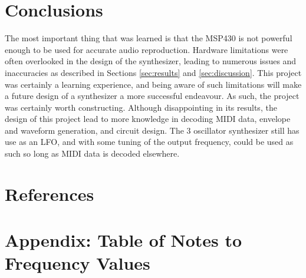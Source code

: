 \documentclass[12pt]{article}
\begin{document}
\section{Conclusions}\label{sec:conclusions}


The most important thing that was learned is that the MSP430 is not powerful enough to be used for accurate audio reproduction. Hardware limitations were often overlooked in the design of the synthesizer, leading to numerous issues and inaccuracies as described in Sections \ref{sec:results} and \ref{sec:discussion}. This project was certainly a learning experience, and being aware of such limitations will make a future design of a synthesizer a more successful endeavour. As such, the project was certainly worth constructing. Although disappointing in its results, the design of this project lead to more knowledge in decoding MIDI data, envelope and waveform generation, and circuit design. The 3 oscillator synthesizer still has use as an LFO, and with some tuning of the output frequency, could be used as such so long as MIDI data is decoded elsewhere. 

\section{References}




\break

\appendix

\section{Appendix: Table of Notes to Frequency Values}\label{sec:-table-of-notes-to-frequency-values}



\end{document}
